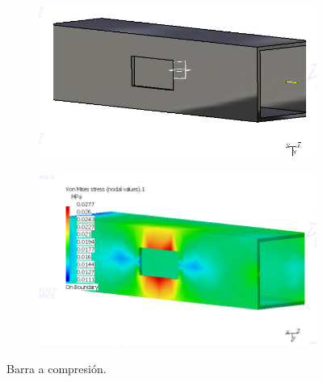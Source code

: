 \documentclass[12pt, letterpaper]{article}
\begin{document}
\begin{figure}[H]
	\centering
	\begin{subfigure}[b]{0.7\linewidth}
		\includegraphics[width=\linewidth]{c1.png}
		\caption{}
	\end{subfigure}
	\begin{subfigure}[b]{0.7\linewidth}
		\includegraphics[width=\linewidth]{c2.png}
		\caption{}
	\end{subfigure}
	\caption{Barra a compresión.}
\end{figure}
\end{document}
